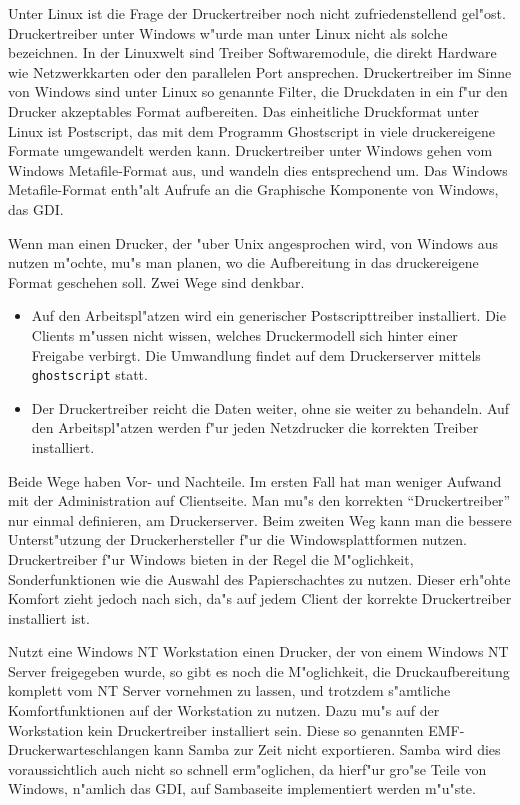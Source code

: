 \documentclass{scrartcl}\usepackage{pslatex}\typearea{12}
\newcommand{\prog}{\texttt}
\begin{document}
Unter Linux ist die Frage der Druckertreiber noch nicht
zufriedenstellend gel"ost. Druckertreiber unter Windows w"urde man
unter Linux nicht als solche bezeichnen. In der Linuxwelt sind Treiber
Softwaremodule, die direkt Hardware wie Netzwerkkarten oder den
parallelen Port ansprechen. Druckertreiber im Sinne von Windows sind
unter Linux so genannte Filter, die Druckdaten in ein f"ur den Drucker
akzeptables Format aufbereiten. Das einheitliche Druckformat unter
Linux ist Postscript, das mit dem Programm Ghostscript in viele
druckereigene Formate umgewandelt werden kann. Druckertreiber unter
Windows gehen vom Windows Metafile-Format aus, und wandeln dies
entsprechend um. Das Windows Metafile-Format enth"alt Aufrufe an die
Graphische Komponente von Windows, das GDI.

Wenn man einen Drucker, der "uber Unix angesprochen wird, von Windows
aus nutzen m"ochte, mu"s man planen, wo die Aufbereitung in das
druckereigene Format geschehen soll. Zwei Wege sind denkbar.

\begin{itemize}
\item Auf den Arbeitspl"atzen wird ein generischer Postscripttreiber
  installiert. Die Clients m"ussen nicht wissen, welches Druckermodell
  sich hinter einer Freigabe verbirgt.  Die Umwandlung findet auf dem
  Druckerserver mittels \prog{ghostscript} statt.
\item Der Druckertreiber reicht die Daten weiter, ohne sie weiter zu
  behandeln. Auf den Arbeitspl"atzen werden f"ur jeden Netzdrucker die
  korrekten Treiber installiert.
\end{itemize}

Beide Wege haben Vor- und Nachteile. Im ersten Fall hat man weniger
Aufwand mit der Administration auf Clientseite. Man mu"s den korrekten
"`Druckertreiber"' nur einmal definieren, am Druckerserver.  Beim
zweiten Weg kann man die bessere Unterst"utzung der Druckerhersteller
f"ur die Windowsplattformen nutzen. Druckertreiber f"ur Windows bieten
in der Regel die M"oglichkeit, Sonderfunktionen wie die Auswahl des
Papierschachtes zu nutzen. Dieser erh"ohte Komfort zieht jedoch nach
sich, da"s auf jedem Client der korrekte Druckertreiber installiert
ist.

Nutzt eine Windows NT Workstation einen Drucker, der von einem Windows
NT Server freigegeben wurde, so gibt es noch die M"oglichkeit, die
Druckaufbereitung komplett vom NT Server vornehmen zu lassen, und
trotzdem s"amtliche Komfortfunktionen auf der Workstation zu nutzen.
Dazu mu"s auf der Workstation kein Druckertreiber installiert sein.
Diese so genannten EMF-Druckerwarteschlangen kann Samba zur Zeit nicht
exportieren. Samba wird dies voraussichtlich auch nicht so schnell
erm"oglichen, da hierf"ur gro"se Teile von Windows, n"amlich das GDI,
auf Sambaseite implementiert werden m"u"ste.
\end{document}
